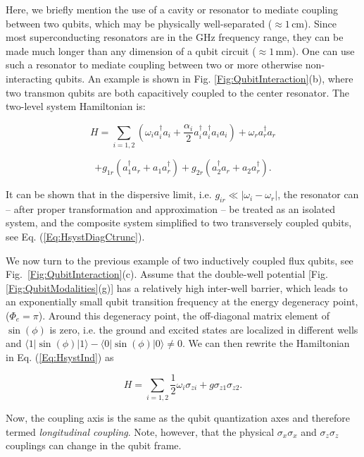 \documentclass[aip,apr,twocolumn,showpacs,superscriptaddress,groupedaddress,nofootinbib,reprint]{revtex4-1}  %
\begin{document}
Here, we briefly mention the use of a cavity or resonator to mediate coupling between two qubits, which may be physically well-separated ($\approx 1\,$cm). Since most superconducting resonators are in the GHz frequency range, they can be made much longer than any dimension of a qubit circuit ($\approx 1\,$mm). One can use such a resonator to mediate coupling between two or more otherwise non-interacting qubits. An example is shown in Fig. \ref{Fig:QubitInteraction}(b), where two transmon qubits are both capacitively coupled to the center resonator. The two-level system Hamiltonian is:

\begin{equation*}
H = \sum_{i = 1,2} \left( \omega_i a_{i}^{\dagger}a_{i} + \frac{\alpha_i}{2}a_{i}^{\dagger}a_{i}^{\dagger}a_{i}a_{i}\right) + \omega_r a_{r}^{\dagger}a_{r}
\end{equation*}

\begin{equation}
+ g_{1r} \left(a_{1}^{\dagger}a_{r} + a_{1}a_{r}^{\dagger}\right) + g_{2r} \left(a_{2}^{\dagger}a_{r} + a_{2} a_{r}^{\dagger}\right).
\label{Eq:HsystCircuitQED2}
\end{equation}

It can be shown that in the dispersive limit, i.e. $g_{ir} \ll |\omega_i - \omega_r|$, the resonator can -- after proper transformation and approximation -- be treated as an isolated system, and the composite system simplified to two transversely coupled qubits, see Eq. (\ref{Eq:HsystDiagCtrunc}).

We now turn to the previous example of two inductively coupled flux qubits, see Fig.~\ref{Fig:QubitInteraction}(c). Assume that the double-well potential [Fig. \ref{Fig:QubitModalities}(g)] has a relatively high inter-well barrier, which leads to an exponentially small qubit transition frequency at the energy degeneracy point, ($\Phi_{e} = \pi$). Around this degeneracy point, the off-diagonal matrix element of $\sin(\phi)$ is zero, i.e. the ground and excited states are localized in different wells and $\langle 1 | \sin(\phi) | 1\rangle - \langle 0 | \sin(\phi) | 0\rangle \neq 0$. We can then rewrite the Hamiltonian in Eq. (\ref{Eq:HsystInd}) as

\begin{equation}
H = \sum_{i = 1,2} \frac{1}{2}\omega_i \sigma_{zi} + g \sigma_{z1}\sigma_{z2}.
\label{Eq:HsystDiagL}
\end{equation}

\noindent Now, the coupling axis is the same as the qubit quantization axes and therefore termed \textit{longitudinal coupling}. Note, however, that the physical $\sigma_{x}\sigma_{x}$ and $\sigma_{z}\sigma_{z}$ couplings can change in the qubit frame.
\end{document}
